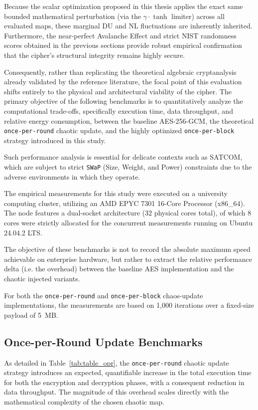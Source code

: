 \documentclass[11pt,a4paper]{report}
\begin{document}
Because the scalar optimization proposed in this thesis applies the exact same bounded mathematical perturbation (via the $\gamma \cdot \tanh$ limiter) across all evaluated maps, these marginal DU and NL fluctuations are inherently inherited. 
Furthermore, the near-perfect Avalanche Effect and strict NIST randomness scores obtained in the previous sections provide robust empirical confirmation that the cipher's structural integrity remains highly secure. 

Consequently, rather than replicating the theoretical algebraic cryptanalysis already validated by the reference literature, the focal point of this evaluation shifts entirely to the physical and architectural viability of the cipher. 
The primary objective of the following benchmarks is to quantitatively analyze the computational trade-offs, specifically execution time, data throughput, and relative energy consumption, between the baseline AES-256-GCM, the theoretical \texttt{once-per-round} chaotic update, 
and the highly optimized \texttt{once-per-block} strategy introduced in this study.

Such performance analysis is essential for delicate contexts such as SATCOM, which are subject to strict \texttt{SWaP} (Size, Weight, and Power) constraints due to the adverse environments in which they operate.

The empirical measurements for this study were executed on a university computing cluster, utilizing an AMD EPYC 7301 16-Core Processor (x86\_64). 
The node features a dual-socket architecture (32 physical cores total), of which 8 cores were strictly allocated for the concurrent measurements running on Ubuntu 24.04.2 LTS. 

The objective of these benchmarks is not to record the absolute maximum speed achievable on enterprise hardware, but rather to extract the relative performance delta (i.e. the overhead)
between the baseline AES implementation and the chaotic injected variants.

For both the \texttt{once-per-round} and \texttt{once-per-block} chaos-update implementations, 
the measurements are based on 1,000 iterations over a fixed-size payload of 5~MB.

\subsection{Once-per-Round Update Benchmarks}
As detailed in Table~\ref{tab:table_opr}, the \texttt{once-per-round} chaotic update strategy introduces an expected, quantifiable increase in the total execution time for both the encryption and decryption phases, with a consequent reduction in data throughput. 
The magnitude of this overhead scales directly with the mathematical complexity of the chosen chaotic map.
\end{document}
